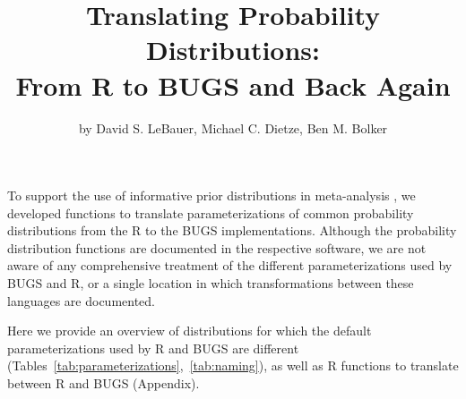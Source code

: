 \title{Translating Probability Distributions:\\ From R to BUGS and Back Again}
\author{by David S. LeBauer, Michael C. Dietze, Ben M. Bolker}

\maketitle


To support the use of informative prior distributions in meta-analysis \citep{lebauer2012ffb}, we developed functions to translate parameterizations of common probability distributions from the R to the BUGS implementations.
Although the probability distribution functions are documented in the respective software, we are not aware of any comprehensive treatment of the different parameterizations used by BUGS and R, or a single location in which transformations between these languages are documented.

Here we provide an overview of distributions for which the default parameterizations used by R and BUGS are different (Tables~\ref{tab:parameterizations},~\ref{tab:naming}), as well as R functions to translate between R and BUGS (Appendix).

